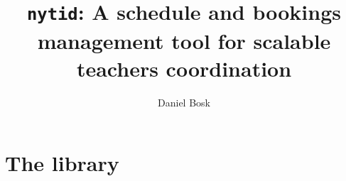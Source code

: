 \documentclass[a4paper,oneside]{book}
\title{%
  \texttt{nytid}: A schedule and bookings management tool for scalable teachers 
  coordination
}
\author{%
  Daniel Bosk
}
\affil{%
  KTH EECS\\
  \texttt{dbosk@kth.se}
}
\newenvironment{abstract}{}{}
\begin{document}
\frontmatter
\maketitle

\vspace*{\fill}
\clearpage

\begin{abstract}
  
\end{abstract}
\clearpage

\tableofcontents
\clearpage

\mainmatter
\part{The library}







%
%



\backmatter
\printbibliography
\end{document}
